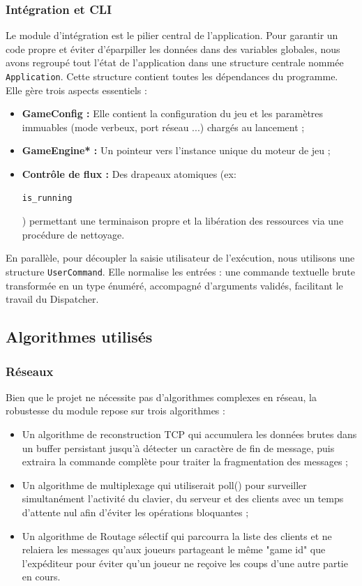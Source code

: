 \documentclass[11pt,a4paper,titlepage,oneside]{article}
\begin{document}
    \subsubsection{Intégration et CLI}
    Le module d'intégration est le pilier central de l'application. Pour garantir un code propre et éviter d'éparpiller les données dans des variables globales, nous avons regroupé tout l'état de l'application dans une structure centrale nommée \texttt{Application}.
    Cette structure contient toutes les dépendances du programme. Elle gère trois aspects essentiels : 
    \begin{itemize}
        \item \textbf{GameConfig :} Elle contient la configuration du jeu et les paramètres immuables (mode verbeux, port réseau ...) chargés au lancement ;
        \item \textbf{GameEngine* :} Un pointeur vers l'instance unique du moteur de jeu ;
        \item \textbf{Contrôle de flux :} Des drapeaux atomiques (ex: \begin{verbatim}is_running\end{verbatim}) permettant une terminaison propre et la libération des ressources via une procédure de nettoyage.
    \end{itemize}
    En parallèle, pour découpler la saisie utilisateur de l'exécution, nous utilisons une structure \texttt{UserCommand}. Elle normalise les entrées : une commande textuelle brute transformée en un type énuméré, accompagné d'arguments validés, facilitant le travail du Dispatcher.
    

    \subsection{Algorithmes utilisés} 
    \subsubsection{Réseaux}
    Bien que le projet ne nécessite pas d'algorithmes complexes en réseau, la robustesse du module repose sur trois algorithmes :
    \begin{itemize}
        \item Un algorithme de reconstruction TCP qui accumulera les données brutes dans un buffer persistant jusqu'à détecter un caractère de fin de message, puis extraira la commande complète pour traiter la fragmentation des messages ;
        \item Un algorithme de multiplexage qui utiliserait poll() pour surveiller simultanément l'activité du clavier, du serveur et des clients avec un temps d'attente nul afin d'éviter les opérations bloquantes ;
        \item Un algorithme de Routage sélectif qui parcourra la liste des clients et ne relaiera les messages qu'aux joueurs partageant le même "game id" que l'expéditeur pour éviter qu'un joueur ne reçoive les coups d'une autre partie en cours.
    \end{itemize}
    
\end{document}

